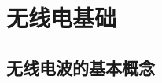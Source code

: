 
\chapter{无线电基础}
\label{chap:radio_fundamentals}

\section{无线电波的基本概念}
\label{sec:radio_wave_concept}

